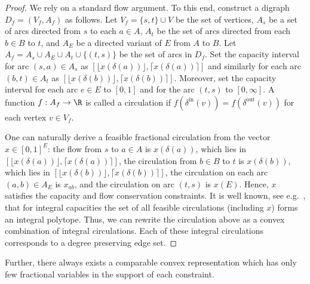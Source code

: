 \begin{proof}
    We rely on a standard flow argument. 
    To this end, construct a digraph $D_f = (V_f , A_f)$ as follows. Let $V_f = \{s,t\} \cup V$ be the set of vertices, $A_s$ be a set of arcs directed from $s$ to each $a \in A$, $A_t$ be the set of arcs directed from each $b \in B$ to $t$, and $A_E$ be a directed variant of $E$ from $A$ to $B$. Let $A_f = A_s \cup A_E  \cup A_t \cup \{(t,s)\}$ be the set of arcs in $D_f$. Set the capacity interval for arc $(s,a) \in A_s$ as $[\lfloor x(\delta(a)) \rfloor, \lceil x(\delta(a)) \rceil]$ and similarly for each arc $(b,t) \in A_t$ as $[\lfloor x(\delta(b)) \rfloor, \lceil x(\delta(b)) \rceil]$. Moreover, set the capacity interval for each arc $e \in E$ to $[0,1]$ and for the arc $(t,s)$ to $[0,\infty]$. A function $f: A_f \rightarrow \R$ is called a circulation if $f(\delta^{\mathrm{in}}(v)) = f(\delta^{\mathrm{out}}(v))$ for each vertex $v \in V_f$. 
    
    One can naturally derive a feasible fractional circulation from the vector $x\in [0,1]^E$: the flow from $s$ to $a \in A$ is $x(\delta(a))$, which lies in $[\lfloor x(\delta(a)) \rfloor, \lceil x(\delta(a)) \rceil]$, the circulation from $b \in B$ to $t$ is $x(\delta(b))$, which lies in $[\lfloor x(\delta(b)) \rfloor, \lceil x(\delta(b)) \rceil]$, the circulation on each arc $(a,b) \in A_E$ is $x_{ab}$, and the circulation on arc $(t,s)$ is $x(E)$. Hence, $x$ satisfies the capacity and flow conservation constraints. 
    It is well known, see e.g.~\cite[Corollary 13.10b]{schrijver2003combinatorial}, that for integral capacities the set of all feasible circulations (including $x$) forms an integral polytope. Thus, we can rewrite the circulation above as a convex combination
    of integral circulations. Each of these integral circulations corresponds
    to a degree preserving edge set.
\end{proof}

Further, there always exists a comparable convex representation which has only few fractional variables in the support of each constraint.

\BoundedNumberOfFracVariables*

